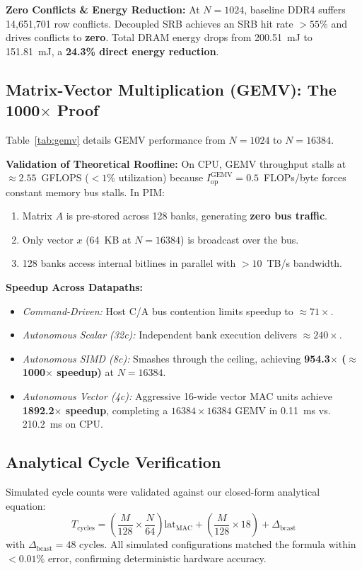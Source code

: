 \documentclass[10pt,twocolumn]{article}
\begin{document}
\textbf{Zero Conflicts \& Energy Reduction:} At $N=1024$, baseline DDR4 suffers 14,651,701 row conflicts. Decoupled SRB achieves an SRB hit rate $>55\%$ and drives conflicts to \textbf{zero}. Total DRAM energy drops from 200.51~mJ to 151.81~mJ, a \textbf{24.3\% direct energy reduction}.

\subsection{Matrix-Vector Multiplication (GEMV): The 1000$\times$ Proof}
Table~\ref{tab:gemv} details GEMV performance from $N=1024$ to $N=16384$.

\textbf{Validation of Theoretical Roofline:} On CPU, GEMV throughput stalls at $\approx 2.55$~GFLOPS ($<1\%$ utilization) because $I_{\text{op}}^{\text{GEMV}} = 0.5$~FLOPs/byte forces constant memory bus stalls. In PIM:
\begin{enumerate}
    \item Matrix $A$ is pre-stored across 128 banks, generating \textbf{zero bus traffic}.
    \item Only vector $x$ (64~KB at $N=16384$) is broadcast over the bus.
    \item 128 banks access internal bitlines in parallel with $>10$~TB/s bandwidth.
\end{enumerate}

\textbf{Speedup Across Datapaths:}
\begin{itemize}
    \item \textit{Command-Driven:} Host C/A bus contention limits speedup to $\approx 71\times$.
    \item \textit{Autonomous Scalar (32c):} Independent bank execution delivers $\approx 240\times$.
    \item \textit{Autonomous SIMD (8c):} Smashes through the ceiling, achieving \textbf{954.3$\times$ ($\approx$1000$\times$ speedup)} at $N=16384$.
    \item \textit{Autonomous Vector (4c):} Aggressive 16-wide vector MAC units achieve \textbf{1892.2$\times$ speedup}, completing a $16384 \times 16384$ GEMV in 0.11~ms vs. 210.2~ms on CPU.
\end{itemize}

\subsection{Analytical Cycle Verification}
Simulated cycle counts were validated against our closed-form analytical equation:
\begin{equation}
    T_{\text{cycles}} = \left( \frac{M}{128} \times \frac{N}{64} \right) \text{lat}_{\text{MAC}} + \left( \frac{M}{128} \times 18 \right) + \Delta_{\text{bcast}}
\end{equation}
with $\Delta_{\text{bcast}} = 48$ cycles. All simulated configurations matched the formula within $<0.01\%$ error, confirming deterministic hardware accuracy.
\end{document}
